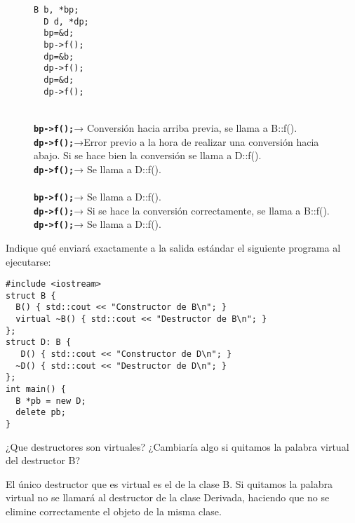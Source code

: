 \begin{figure}[h]
  \begin{minipage}{0.2\textwidth}
    \begin{lstlisting}[frame = single]
  B b, *bp;
  D d, *dp;
  bp=&d;
  bp->f();
  dp=&b;
  dp->f();
  dp=&d;
  dp->f();
    \end{lstlisting}
  \end{minipage}
  \hfill
  \begin{minipage}{0.75\textwidth}
    \\
    \textbf{\texttt{bp->f();}}→ Conversión hacia arriba previa, se llama a B::f().  \\
    \textbf{\texttt{dp->f();}}→Error previo a la hora de realizar una conversión hacia abajo. Si se hace bien la conversión se llama a D::f().\\
    \textbf{\texttt{dp->f();}}→ Se llama a D::f().\\

    \\
    \textbf{\texttt{bp->f();}}→ Se llama a D::f().\\
    \textbf{\texttt{dp->f();}}→ Si se hace la conversión correctamente, se llama a B::f(). \\
    \textbf{\texttt{dp->f();}}→ Se llama a D::f().\\
  \end{minipage}
\end{figure}

\newpage
{} Indique qué enviará exactamente a la salida estándar el siguiente programa al ejecutarse:
\begin{center}
  \begin{lstlisting}[frame = single]
#include <iostream>
struct B {
  B() { std::cout << "Constructor de B\n"; }
  virtual ~B() { std::cout << "Destructor de B\n"; }
};
struct D: B {
   D() { std::cout << "Constructor de D\n"; }
  ~D() { std::cout << "Destructor de D\n"; }
};
int main() {
  B *pb = new D;
  delete pb;
}
  \end{lstlisting}
\end{center}

¿Que destructores son virtuales? ¿Cambiaría algo si quitamos la palabra virtual del destructor B?

El único destructor que es virtual es el de la clase B.
Si quitamos la palabra virtual no se llamará al destructor de la clase Derivada, haciendo que no se elimine correctamente el objeto de la misma clase.

